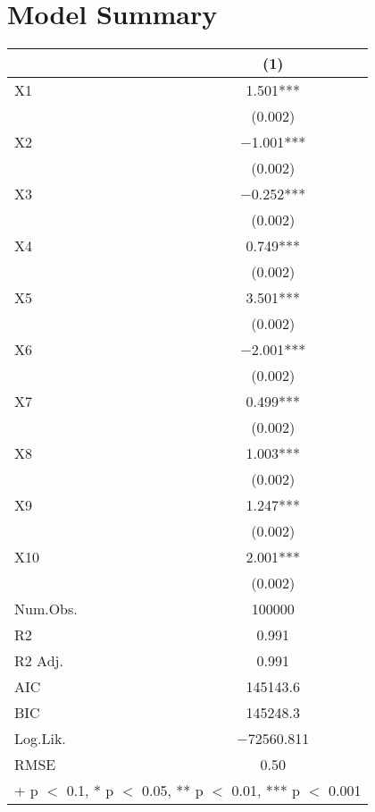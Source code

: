 \documentclass{article}
\begin{document}
\section{Model Summary}
\begin{table}
\centering
\begin{tabular}[t]{lc}
\toprule
  & (1)\\
\midrule
X1 & \num{1.501}***\\
 & \vphantom{9} (\num{0.002})\\
X2 & \num{-1.001}***\\
 & \vphantom{8} (\num{0.002})\\
X3 & \num{-0.252}***\\
 & \vphantom{7} (\num{0.002})\\
X4 & \num{0.749}***\\
 & \vphantom{6} (\num{0.002})\\
X5 & \num{3.501}***\\
 & \vphantom{5} (\num{0.002})\\
X6 & \num{-2.001}***\\
 & \vphantom{4} (\num{0.002})\\
X7 & \num{0.499}***\\
 & \vphantom{3} (\num{0.002})\\
X8 & \num{1.003}***\\
 & \vphantom{2} (\num{0.002})\\
X9 & \num{1.247}***\\
 & \vphantom{1} (\num{0.002})\\
X10 & \num{2.001}***\\
 & (\num{0.002})\\
\midrule
Num.Obs. & \num{100000}\\
R2 & \num{0.991}\\
R2 Adj. & \num{0.991}\\
AIC & \num{145143.6}\\
BIC & \num{145248.3}\\
Log.Lik. & \num{-72560.811}\\
RMSE & \num{0.50}\\
\bottomrule
\multicolumn{2}{l}{\rule{0pt}{1em}+ p $<$ 0.1, * p $<$ 0.05, ** p $<$ 0.01, *** p $<$ 0.001}\\
\end{tabular}
\end{table}
\end{document}
